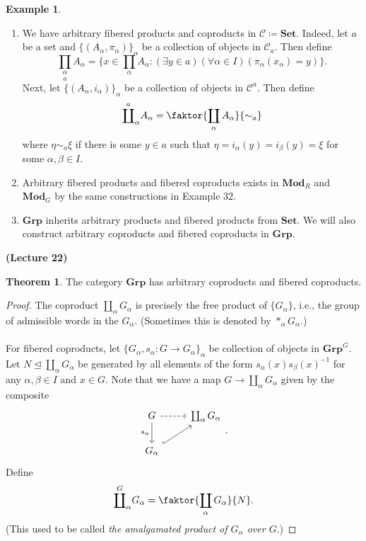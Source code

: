 \documentclass[10pt,letterpaper,cm]{nupset}
\theoremstyle{definition}
\newtheorem{exmp}{Example}
\newtheorem{theorem}{Theorem}
\newcommand{\1}{\mathbf{1}}
\renewcommand{\c}{\mathscr{C}}
\newcommand{\0}{\vec 0}
\begin{document}
\begin{exmp} $ $
\begin{enumerate}
\item We have arbitrary fibered products and coproducts in $\c\coloneqq  \mathbf{Set}$. Indeed, let $a$ be a set and $\{(A_{\alpha}, \pi_{\alpha})\}_{\alpha}$ be a collection of objects in $\c_a$. Then define $$\underset{a}{\prod_{\alpha}} A_{\alpha} = \{x \in \prod_{\alpha} A_{\alpha} :  (\exists y \in a)(\forall \alpha \in I)(\pi_{\alpha}(x_{\alpha}) = y)\}.$$ Next, let $\{(A_{\alpha}, i_{\alpha})\}_{\alpha}$ be a collection of objects in $\c^a$. Then define $$ 
\overset{a}{\coprod}_{\alpha}A_{\alpha} = \faktor{\coprod_{\alpha} A_{\alpha}}{\sim_a}$$ where $\eta \sim_a \xi$ if there is some $y \in a$ such that $\eta = i_{\alpha}(y) = i_{\beta}(y) = \xi$ for some $\alpha, \beta \in I$.
\item Arbitrary fibered products and fibered coproducts exists in $\mathbf{Mod}_R$ and $\mathbf{Mod}_G$ by the same constructions in Example 32.
\item $\mathbf{Grp}$ inherits arbitrary products and fibered products from $\mathbf{Set}$. We will also construct arbitrary coproducts and fibered coproducts in $\mathbf{Grp}$. 
\end{enumerate}
\end{exmp}

\begin{center}
{\textbf{(Lecture 22)}}
\end{center}

\begin{theorem}
The category $\mathbf{Grp}$ has arbitrary coproducts and fibered coproducts.
\end{theorem}
\begin{proof}
The coproduct $\coprod_{\alpha} G_{\alpha}$ is precisely the free product of $\{G_{\alpha}\}$, i.e., the group of admissible words in the $G_{\alpha}$. (Sometimes this is denoted by $\ast_{\alpha} G_{\alpha}$.)
\\ \\ For fibered coproducts, let $\{G_{\alpha}, s_{\alpha} : G \to G_{\alpha}\}_{\alpha}$ be collection of objects in $\mathbf{Grp}^G$. Let $N \unlhd \coprod_{\alpha} G_{\alpha}$ be generated by all elements of the form $s_{\alpha}(x)s_{\beta}(x)^{-1}$ for any $\alpha, \beta \in I$ and $x\in G$. Note that we have a map $G \to \coprod_{\alpha} G_{\alpha}$ given by the composite
\[
\begin{tikzcd}
G \arrow[d, "s_{\alpha}"'] \arrow[r, dashed] & \coprod_{\alpha}G_{\alpha} \\
G_{\alpha} \arrow[ru, hook] & 
\end{tikzcd}
.\] Define $$\overset{G}{\coprod}_{\alpha} G_{\alpha} = \faktor{\coprod_{\alpha} G_{\alpha}}{N}.$$ (This used to be called \textit{the amalgamated product of $G_{\alpha}$ over $G$}.)
\end{proof}
\end{document}
